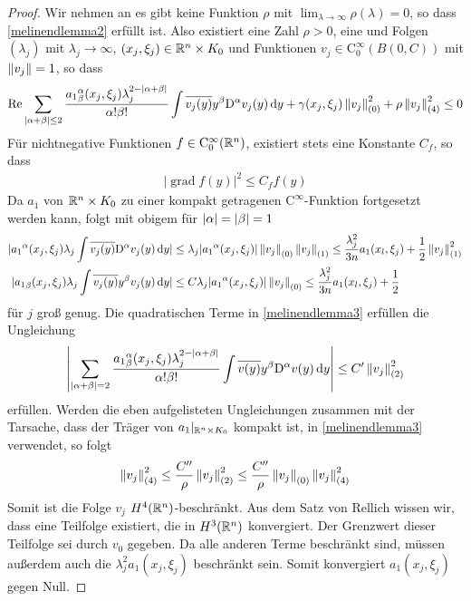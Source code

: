\begin{proof}
Wir nehmen an es gibt keine Funktion $\rho$ mit $\lim_{\lambda\to\infty}\rho(\lambda)=0$, so dass \eqref{melinendlemma2} erfüllt ist. Also existiert eine Zahl $\rho>0$, eine und Folgen $(\lambda_j)$ mit $\lambda_j\to\infty$, $(x_j,\xi_j)\in\mathbb R^n\times K_0$ und Funktionen $v_j\in\mathrm C^\infty_0(B(0,C))$ mit $\left\lVert v_j\right\rVert =1$, so dass
\begin{align}\label{melinendlemma3}
\operatorname{Re} \sum_{|\alpha+\beta|\le 2} \frac{{a_1}^\alpha_\beta(x_j,\xi_j)\lambda_j^{2-|\alpha+\beta|}}{\alpha!\beta!}\int\overline{v_j(y)}y^\beta\mathrm D^\alpha v_j(y)\,\mathrm d y + \gamma(x_j,\xi_j)\left\lVert v_j\right\rVert_{(0)}^2 + \rho\left\lVert v_j\right\rVert _{(4)}^2 \le 0
\end{align}
Für nichtnegative Funktionen $f\in\mathrm C^\infty_0 (\mathbb R^n)$,  existiert stets eine Konstante $C_f$, so dass
\begin{align*}
|\operatorname{grad}f(y)|^2\le C_f f(y)
\end{align*}
Da $a_1$ von $\mathbb R^n\times K_0$ zu einer kompakt getragenen $\mathrm C^\infty$-Funktion fortgesetzt werden kann, folgt mit obigem für $\lvert\alpha\rvert=\lvert\beta\rvert=1$
\begin{align*}
|{a_1}^\alpha(x_j,\xi_j)\lambda_j\int \overline{v_j(y)}\mathrm D^\alpha v_j(y)\,\mathrm d y| &\le \lambda_j|{a_1}^\alpha(x_j,\xi_j)|\left\lVert v_j\right\rVert_{(0)}\left\lVert v_j\right\rVert_{(1)} \le \frac{\lambda_j^2}{3n}a_1(x_l,\xi_j) + \frac 1 2\left\lVert v_j\right\rVert_{(1)}^2\\
|{a_1}_\beta(x_j,\xi_j)\lambda_j\int \overline{v_j(y)}y^\beta v_j(y)\,\mathrm d y| &\le C \lambda_j|{a_1}^\alpha(x_j,\xi_j)|\left\lVert v_j\right\rVert_{(0)} \le \frac{\lambda_j^2}{3n}a_1(x_l,\xi_j) + \frac 1 2
\end{align*}
für $j$ groß genug. Die quadratischen Terme in \eqref{melinendlemma3} erfüllen die Ungleichung
\begin{align*}
\left\lvert\sum_{|\alpha+\beta|= 2} \frac{{a_1}^\alpha_\beta(x_j,\xi_j)\lambda_j^{2-|\alpha+\beta|}}{\alpha!\beta!}\int\overline{v(y)}y^\beta\mathrm D^\alpha v(y)\,\mathrm d y\right\rvert\le C'\left\lVert v_j\right\rVert_{(2)}^2
\end{align*}
erfüllen. Werden die eben aufgelisteten Ungleichungen zusammen mit der Tarsache, dass der Träger von $a_1|_{\mathbb R^n\times K_0}$ kompakt ist, in \eqref{melinendlemma3} verwendet, so folgt
\begin{align*}
\left\lVert v_j\right\rVert_{(4)}^2\le \frac{C''}{\rho}\left\lVert v_j\right\rVert_{(2)}^2\le \frac{C''}{\rho}\left\lVert v_j\right\rVert_{(0)}\left\lVert v_j\right\rVert_{(4)}^2
\end{align*}
Somit ist die Folge $v_j$ $H^4(\mathbb R^n)$-beschränkt. Aus dem Satz von Rellich wissen wir, dass eine Teilfolge existiert, die in $H^3(\mathbb R^n)$ konvergiert. Der Grenzwert dieser Teilfolge sei durch $v_0$ gegeben. Da alle anderen Terme beschränkt sind, müssen außerdem auch die $\lambda_j^2a_1(x_j,\xi_j)$ beschränkt sein. Somit konvergiert $a_1(x_j,\xi_j)$ gegen Null. 

\end{proof}
